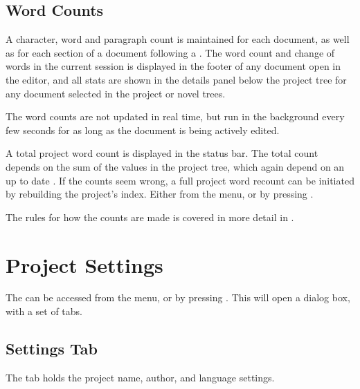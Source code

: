 \documentclass[a4paper,11pt,english]{sphinxmanual}
\begin{document}
\sphinxAtStartPar
{}


\subsection{Word Counts}
\label{\detokenize{project_overview:word-counts}}\label{\detokenize{project_overview:a-proj-files-counts}}
\sphinxAtStartPar
A character, word and paragraph count is maintained for each document, as well as for each section
of a document following a {\hyperref[\detokenize{int_glossary:term-Headings}]{}}. The word count and change of words in the
current session is displayed in the footer of any document open in the editor, and all stats are
shown in the details panel below the project tree for any document selected in the project or novel
trees.

\sphinxAtStartPar
The word counts are not updated in real time, but run in the background every few seconds for as
long as the document is being actively edited.

\sphinxAtStartPar
A total project word count is displayed in the status bar. The total count depends on the sum of
the values in the project tree, which again depend on an up to date {\hyperref[\detokenize{int_glossary:term-Project-Index}]{}}. If the
counts seem wrong, a full project word recount can be initiated by rebuilding the project’s index.
Either from the  menu, or by pressing .

\sphinxAtStartPar
The rules for how the counts are made is covered in more detail in {\hyperref[\detokenize{more_counting:a-counting}]{}}.


\section{Project Settings}
\label{\detokenize{project_overview:project-settings}}\label{\detokenize{project_overview:a-proj-settings}}
\sphinxAtStartPar
The  can be accessed from the  menu, or by pressing
. This will open a dialog box, with a set of tabs.


\subsection{Settings Tab}
\label{\detokenize{project_overview:settings-tab}}
\sphinxAtStartPar
The  tab holds the project name, author, and language settings.
\end{document}

